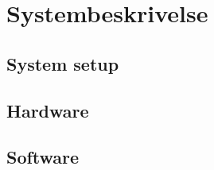 \chapter{Systembeskrivelse}\label{chap:Systembeskrivelse}

\section{System setup}\label{sec:SystemSetup}

\section{Hardware}\label{sec:Hardware}

\section{Software}\label{sec:Software}